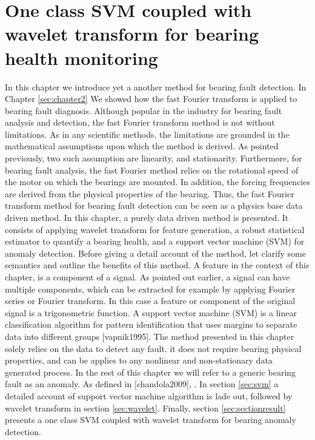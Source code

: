 \documentclass[../Main/thesis.tex]{subfiles}
\begin{document}
\chapter[One class SVM coupled with wavelet transform for bearing health monitoring]{One class SVM coupled with wavelet transform for bearing health monitoring}
\label{sec:waveletandsvm}
In this chapter we introduce yet a another method for bearing fault detection. In Chapter \ref{sec:chapter2} We showed how the fast Fourier transform is applied to bearing fault diagnosis. Although popular in the industry for bearing fault analysis and detection, the fast Fourier transform method is not without limitations. As in any scientific methods, the limitations are grounded in the mathematical assumptions upon which the method is derived. As pointed previously, two such assumption are linearity, and stationarity. Furthermore, for bearing fault analysis, the fast Fourier method relies on the rotational speed of the motor on which the bearings are mounted. In addition, the forcing frequencies are derived from the physical properties of the bearing. Thus, the fast Fourier transform method for bearing fault detection can be seen as a physics base data driven method.
\justify
In this chapter, a purely data driven method is presented. It consists of applying wavelet transform for feature generation, a robust statistical estimator to quantify a bearing health, and a support vector machine (SVM) for anomaly detection. Before giving a detail account of the method, let clarify some semantics and outline the benefits of this method. A feature in the context of this chapter, is a component of a signal. As pointed out earlier, a signal can have multiple components, which can be extracted for example by applying Fourier series or Fourier transform. In this case a feature or component of the original signal is a trigonometric function. A support vector machine (SVM) is a linear classification algorithm for pattern identification that uses margins to separate data into different groups [vapnik1995].
\justify
The method presented in this chapter solely relies on the data to detect any fault. it does not require bearing physical properties, and can be applies to any nonlinear and non-stationary data generated process. In the rest of this chapter we will refer to a generic bearing fault as an anomaly. As defined in [chandola2009], . In section \ref{sec:svm} a detailed account of support vector machine algorithm is lade out, followed by wavelet transform in section \ref{sec:wavelet}. Finally, section \ref{sec:sectionresult} presents a one class SVM coupled with wavelet transform for bearing anomaly detection.
\end{document}
